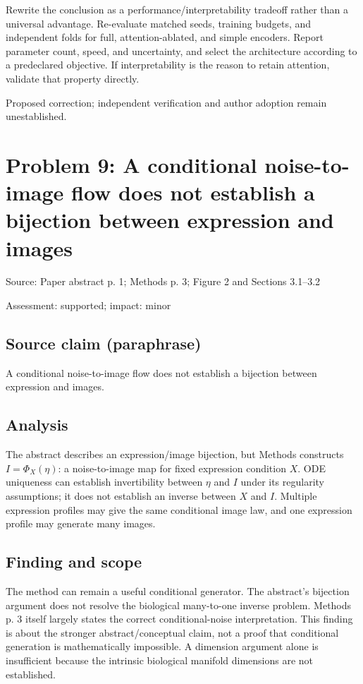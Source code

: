 \documentclass[11pt]{article}
\begin{document}
Rewrite the conclusion as a performance/interpretability tradeoff rather than a universal advantage. Re-evaluate matched seeds, training budgets, and independent folds for full, attention-ablated, and simple encoders. Report parameter count, speed, and uncertainty, and select the architecture according to a predeclared objective. If interpretability is the reason to retain attention, validate that property directly.

Proposed correction; independent verification and author adoption remain unestablished.

\section*{Problem 9: A conditional noise-to-image flow does not establish a bijection between expression and images}

Source: Paper abstract p. 1; Methods p. 3; Figure 2 and Sections 3.1–3.2

Assessment: supported; impact: minor

\subsection*{Source claim (paraphrase)}

A conditional noise-to-image flow does not establish a bijection between expression and images.

\subsection*{Analysis}

The abstract describes an expression/image bijection, but Methods constructs \(I=\Phi_X(\eta)\): a noise-to-image map for fixed expression condition \(X\). ODE uniqueness can establish invertibility between \(\eta\) and \(I\) under its regularity assumptions; it does not establish an inverse between \(X\) and \(I\). Multiple expression profiles may give the same conditional image law, and one expression profile may generate many images.

\subsection*{Finding and scope}

The method can remain a useful conditional generator. The abstract's bijection argument does not resolve the biological many-to-one inverse problem. Methods p. 3 itself largely states the correct conditional-noise interpretation. This finding is about the stronger abstract/conceptual claim, not a proof that conditional generation is mathematically impossible. A dimension argument alone is insufficient because the intrinsic biological manifold dimensions are not established.
\end{document}
